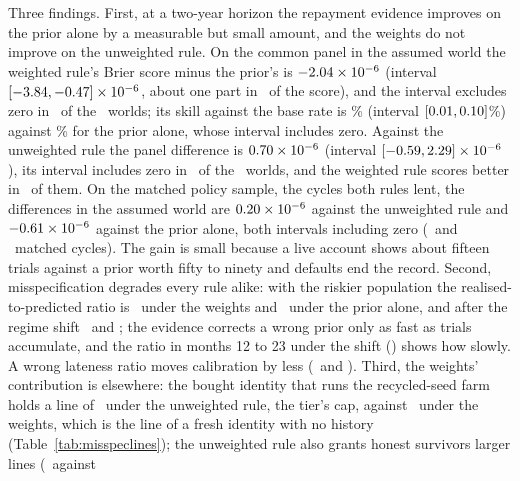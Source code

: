 \documentclass[preprint,11pt,authoryear]{elsarticle}
\begin{document}
Three findings. First, at a two-year horizon the repayment evidence improves on the prior alone by
a measurable but small amount, and the weights do not improve on the unweighted rule. On the common
panel in the assumed world the weighted rule's Brier score minus the prior's is
$-2.04\times10^{-6}$ (interval $[-3.84,
-0.47]\times10^{-6}$, about one part in \PanelGainTierOnlyAssumed\ of the
score), and the interval excludes zero in \PanelBetterThanTierOnly\ of the \MisspecWorlds\ worlds; its skill
against the base rate is \PanelSkillWeightedAssumed\% (interval
$[0.01,0.10]$\%) against \PanelSkillTierOnlyAssumed\%
for the prior alone, whose interval includes zero. Against the unweighted rule the panel difference
is $0.70\times10^{-6}$ (interval $[-0.59,
2.29]\times10^{-6}$), its interval includes zero in \PanelTiedWithUnweighted\
of the \MisspecWorlds\ worlds, and the weighted rule scores better in \PanelWeightedBeatsUnweighted\
of them. On the matched policy sample, the cycles both rules lent, the differences in the assumed
world are $0.20\times10^{-6}$ against the unweighted rule and
$-0.61\times10^{-6}$ against the prior alone, both intervals including zero
(\MatchedCyclesUnweightedAssumed\ and \MatchedCyclesTierOnlyAssumed\ matched cycles). The gain is
small because a live account shows about fifteen trials
against a prior worth fifty to ninety and defaults end the record. Second, misspecification degrades
every rule alike: with the riskier population the realised-to-predicted ratio is
\RatioWeightedRiskier\ under the weights and \RatioTierOnlyRiskier\ under the prior alone, and after
the regime shift \RatioWeightedShift\ and \RatioTierOnlyShift; the evidence corrects a wrong prior
only as fast as trials accumulate, and the ratio in months 12 to 23 under the shift
(\RatioLateWeightedShift) shows how slowly. A wrong lateness ratio moves calibration by less
(\RatioWeightedLateHalf\ and \RatioWeightedLateDouble). Third, the weights' contribution is
elsewhere: the bought identity that runs the recycled-seed farm holds a line of \FarmLineUnweighted\
under the unweighted rule, the tier's cap, against \FarmLineWeighted\ under the weights, which is the
line of a fresh identity with no history (Table~\ref{tab:misspeclines}); the unweighted rule also
grants honest survivors larger lines (\MeanLineUnweightedAssumed\ against \MeanLineWeightedAssumed\
\end{document}
